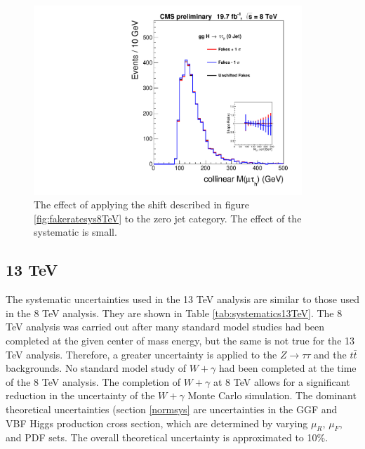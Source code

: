\documentclass[oneside, letterpaper, oldfontcommands]{memoir}
\begin{document}
\begin{figure}[hbtp]\centering
\includegraphics[width=0.9\textwidth]{FakesUpDownShift.pdf}

\caption{The effect of applying the shift described in figure \ref{fig:fakeratesys8TeV} to the zero jet category. The effect of the systematic is small.} 
\label{fig:fakerateupdownsigma}\end{figure}

\subsection{13 TeV}
\qquad The systematic uncertainties used in the 13 TeV analysis are similar to those used in the 8 TeV analysis. They are shown in Table \ref{tab:systematics13TeV}. The 8 TeV analysis was carried out after many standard model studies had been completed \cite{Chatrchyan:2011ds} \cite{Chatrchyan:2014mua} at the given center of mass energy, but the same is not true for the 13 TeV analysis. Therefore, a greater uncertainty is applied to the $Z \rightarrow \tau\tau$ and the $t\bar{t}$ backgrounds. No standard model study of $W+\gamma$ had been completed at the time of the 8 TeV analysis. The completion of $W+\gamma$ at 8 TeV \cite{CMS-PAS-SMP-14-011} allows for a significant reduction in the uncertainty of the $W+\gamma$ Monte Carlo simulation. The dominant theoretical uncertainties (section \ref{normsys} are  uncertainties in the GGF and VBF Higgs production cross section, which are determined by varying $\mu_{R}$, $\mu_{F}$, and PDF sets. The overall theoretical uncertainty is approximated to 10\%. 
\end{document}
